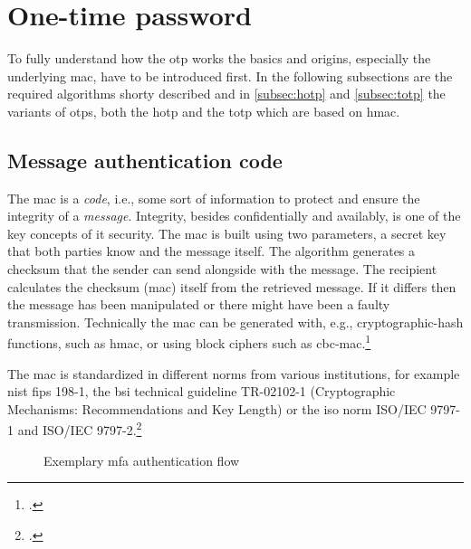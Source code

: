 \section{One-time password}

To fully understand how the \gls{otp} works the basics and origins, especially the underlying \gls{mac}, have to be introduced first. In the following subsections are the required algorithms shorty described and in \autoref{subsec:hotp} and \autoref{subsec:totp} the variants of \glspl{otp}, both the \gls{hotp} and the \gls{totp} which are based on \gls{hmac}.

\newpage

\subsection{Message authentication code}

The \gls{mac} is a \textit{code}, i.e., some sort of information to protect and ensure the integrity of a \textit{message}. Integrity, besides confidentially and availably, is one of the key concepts of \gls{it} security. The \gls{mac} is built using two parameters, a secret key that both parties know and the message itself. The algorithm generates a checksum that the sender can send alongside with the message. The recipient calculates the checksum (\gls{mac}) itself from the retrieved message. If it differs then the message has been manipulated or there might have been a faulty transmission. Technically the \gls{mac} can be generated with, e.g., cryptographic-hash functions, such as \gls{hmac}, or using block ciphers such as \gls{cbc-mac}.\footcites[See][565]{320284}[See][163--168]{anderson2008security}[See][391-393]{eckert-it-sec-9}

The \gls{mac} is standardized in different norms from various institutions, for example \gls{nist} \gls{fips} 198-1, the \gls{bsi} technical guideline TR-02102-1 (\frqq Cryptographic Mechanisms: Recommendations and Key Length\flqq{}) or the \gls{iso} norm ISO/IEC 9797-1 and ISO/IEC 9797-2.\footcites[See][]{FIPS198}[See][]{bsi2019recommendations}[See][]{iso9797-1}[See][]{iso9797-2}

\newpage

\begin{figure}[hbt]
	\centering
	
	\caption[\gls{mac}]{Exemplary \gls{mfa} authentication flow\footnotemark}
	\label{fig:mac}
\end{figure}

